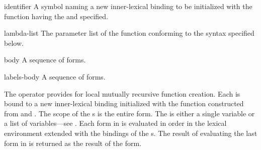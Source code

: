 \begin{optDefinition}
%
\Syntax
{}%
%
\begin{arguments}
    \item[identifier] A symbol naming a new inner-lexical binding to be
    initialized with the function having the  and 
    specified.

    \item[lambda-list] The parameter list of the function conforming to the
    syntax specified below.

    \item[body] A sequence of forms.

    \item[labels-body] A sequence of forms.
\end{arguments}
%
\result%
The  operator provides for local mutually recursive function
creation.  Each  is bound to a new inner-lexical binding
initialized with the function constructed from  and
.  The scope of the s is the entire
 form.  The  is either a single variable or a list
of variables---see .  Each form in  is
evaluated in order in the lexical environment extended with the bindings of the
s.  The result of evaluating the last form in
 is returned as the result of the  form.


\end{optDefinition}
